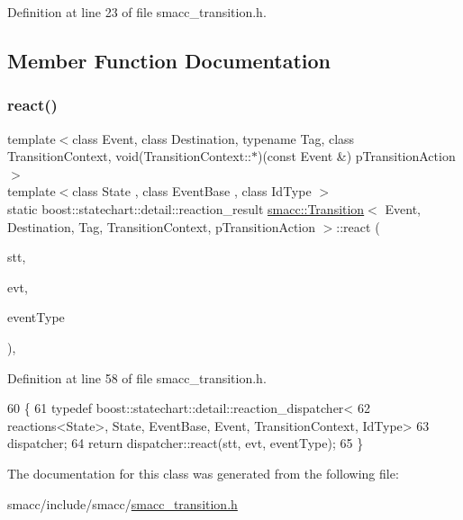 Definition at line 23 of file smacc\+\_\+transition.\+h.



\subsection{Member Function Documentation}
\mbox{\label{classsmacc_1_1Transition_a8399e8d49fa6f3ac72b06df0b2010932}} 
\subsubsection{\texorpdfstring{react()}{react()}}
{\footnotesize\ttfamily template$<$class Event, class Destination, typename Tag, class Transition\+Context, void(\+Transition\+Context\+::$\ast$)(const Event \&) p\+Transition\+Action$>$ \\
template$<$class State , class Event\+Base , class Id\+Type $>$ \\
static boost\+::statechart\+::detail\+::reaction\+\_\+result \hyperlink{classsmacc_1_1Transition}{smacc\+::\+Transition}$<$ Event, Destination, Tag, Transition\+Context, p\+Transition\+Action $>$\+::react (\begin{DoxyParamCaption}\item[{State \&}]{stt,  }\item[{const Event\+Base \&}]{evt,  }\item[{const Id\+Type \&}]{event\+Type }\end{DoxyParamCaption})\hspace{0.3cm}{\ttfamily [inline]}, {\ttfamily [static]}}



Definition at line 58 of file smacc\+\_\+transition.\+h.


\begin{DoxyCode}
60   \{
61     \textcolor{keyword}{typedef} boost::statechart::detail::reaction\_dispatcher<
62         reactions<State>, State, EventBase, Event, TransitionContext, IdType>
63         dispatcher;
64     \textcolor{keywordflow}{return} dispatcher::react(stt, evt, eventType);
65   \}
\end{DoxyCode}


The documentation for this class was generated from the following file\+:\begin{DoxyCompactItemize}
\item 
smacc/include/smacc/\hyperlink{smacc__transition_8h}{smacc\+\_\+transition.\+h}\end{DoxyCompactItemize}
